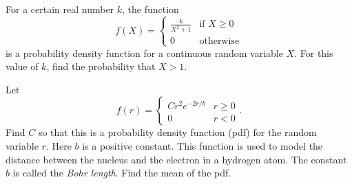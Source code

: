 \documentclass{ximera}
\begin{document}
\begin{question}%

For a certain real number \(k\), the function
\[ f(X) = \begin{cases} \displaystyle \frac{k}{X^2+1} & \text{if } X \geq 0 \\ 0 & \text{otherwise} \end{cases} \]
is a probability density function for a continuous random variable \(X\). For this value of \(k\), find the probability that \(X > 1\).
\begin{multiplechoice}
\end{multiplechoice}

\end{question}

\begin{question}%

Let \[ f(r) = \begin{cases} C r^2 e^{-2r/b} & r \geq 0 \\ 0 & r < 0 \end{cases}. \]
Find \(C\) so that this is a probability density function (pdf) for the random variable \(r\). Here \(b\) is a positive constant. This function is used to model the distance between the nucleus and the electron in a hydrogen atom. The constant \(b\) is called the \textit{Bohr length}. Find the mean of the pdf.
\begin{multiplechoice}
\end{multiplechoice}

\end{question}
\end{document}
